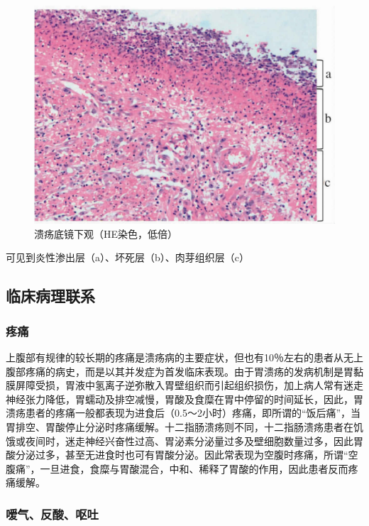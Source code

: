 \begin{figure}[!htbp]
 \centering
 \includegraphics{./images/Image00128.jpg}
 \captionsetup{justification=centering}
 \caption{溃疡底镜下观（HE染色，低倍）}
 \label{fig8-3}
  \end{figure} 

{可见到炎性渗出层（a）、坏死层（b）、肉芽组织层（c）}

\subsection{临床病理联系}

\subsubsection{疼痛}

上腹部有规律的较长期的疼痛是溃疡病的主要症状，但也有10％左右的患者从无上腹部疼痛的病史，而是以其并发症为首发临床表现。由于胃溃疡的发病机制是胃黏膜屏障受损，胃液中氢离子逆弥散入胃壁组织而引起组织损伤，加上病人常有迷走神经张力降低，胃蠕动及排空减慢，胃酸及食糜在胃中停留的时间延长，因此，胃溃疡患者的疼痛一般都表现为进食后（0.5～2小时）疼痛，即所谓的“饭后痛”，当胃排空、胃酸停止分泌时疼痛缓解。十二指肠溃疡则不同，十二指肠溃疡患者在饥饿或夜间时，迷走神经兴奋性过高、胃泌素分泌量过多及壁细胞数量过多，因此胃酸分泌过多，甚至无进食时也可有胃酸分泌。因此常表现为空腹时疼痛，所谓“空腹痛”，一旦进食，食糜与胃酸混合，中和、稀释了胃酸的作用，因此患者反而疼痛缓解。

\subsubsection{嗳气、反酸、呕吐}

